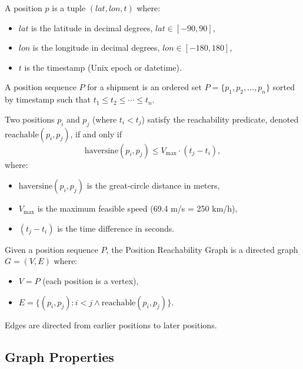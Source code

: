 \begin{definition}[Position]
A position $p$ is a tuple $(\mathit{lat}, \mathit{lon}, t)$ where:
\begin{itemize}
    \item $\mathit{lat}$ is the latitude in decimal degrees, $\mathit{lat} \in [-90, 90]$,
    \item $\mathit{lon}$ is the longitude in decimal degrees, $\mathit{lon} \in [-180, 180]$,
    \item $t$ is the timestamp (Unix epoch or datetime).
\end{itemize}
\end{definition}

\begin{definition}
A position sequence $P$ for a shipment is an ordered set $P = \{p_1, p_2, \ldots, p_n\}$ sorted by timestamp such that $t_1 \leq t_2 \leq \cdots \leq t_n$.
\end{definition}

\begin{definition}
Two positions $p_i$ and $p_j$ (where $t_i < t_j$) satisfy the reachability predicate, denoted $\mathrm{reachable}(p_i, p_j)$, if and only if
\[
\mathrm{haversine}(p_i, p_j) \leq V_{\max} \cdot (t_j - t_i),
\]
where:
\begin{itemize}
    \item $\mathrm{haversine}(p_i, p_j)$ is the great-circle distance in meters,
    \item $V_{\max}$ is the maximum feasible speed (69.4 m/s = 250 km/h),
    \item $(t_j - t_i)$ is the time difference in seconds.
\end{itemize}
\end{definition}

\begin{definition}
Given a position sequence $P$, the Position Reachability Graph is a directed graph $G = (V, E)$ where:
\begin{itemize}
    \item $V = P$ (each position is a vertex),
    \item $E = \{(p_i, p_j) : i < j \wedge \mathrm{reachable}(p_i, p_j)\}$.
\end{itemize}
Edges are directed from earlier positions to later positions.
\end{definition}

\subsection{Graph Properties}

